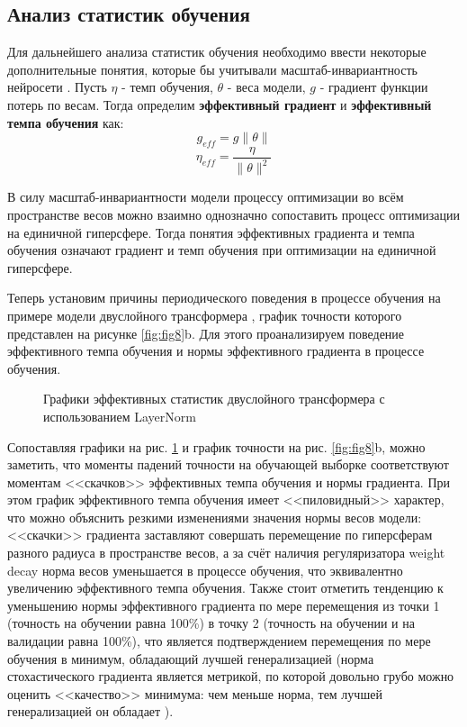 \documentclass{article}
\begin{document}
\subsection{Анализ статистик обучения}
Для дальнейшего анализа статистик обучения необходимо ввести некоторые дополнительные понятия, которые бы учитывали масштаб-инвариантность нейросети \cite{sam, asam}. Пусть $\eta$ - темп обучения, $\theta$ - веса модели, $g$ - градиент функции потерь по весам. Тогда определим \textbf{эффективный градиент} и \textbf{эффективный темпа обучения} как:
$$g_{eff} = g \|\theta\|$$
$$\eta_{eff} = \frac{\eta}{\|\theta\|^2}$$
\par В силу масштаб-инвариантности модели процессу оптимизации во всём пространстве весов можно взаимно однозначно сопоставить процесс оптимизации на единичной гиперсфере. Тогда понятия эффективных градиента и темпа обучения означают градиент и темп обучения при оптимизации на единичной гиперсфере.
\par Теперь установим причины периодического поведения в процессе обучения на примере модели двуслойного трансформера , график точности которого представлен на рисунке \ref{fig:fig8}b. Для этого проанализируем поведение эффективного темпа обучения и нормы эффективного градиента в процессе обучения.
\begin{figure}[h]
\centering
{}
\caption{Графики эффективных статистик двуслойного трансформера с использованием LayerNorm}
\label{fig:fig9}
\end{figure}
\par Сопоставляя графики на рис. \ref{fig:fig9} и график точности на рис. \ref{fig:fig8}b, можно заметить, что моменты падений точности на обучающей выборке соответствуют моментам <<скачков>> эффективных темпа обучения и нормы градиента. При этом график эффективного темпа обучения имеет <<пиловидный>> характер, что можно объяснить резкими изменениями значения нормы весов модели: <<скачки>> градиента заставляют совершать перемещение по гиперсферам разного радиуса в пространстве весов, а за счёт наличия регуляризатора weight decay норма весов уменьшается в процессе обучения, что эквивалентно увеличению эффективного темпа обучения. Также стоит отметить тенденцию к уменьшению нормы эффективного градиента по мере перемещения из точки 1 (точность на обучении равна 100\%) в точку 2 (точность на обучении и на валидации равна 100\%), что является подтверждением перемещения по мере обучения в минимум, обладающий лучшей генерализацией (норма стохастического градиента является метрикой, по которой довольно грубо можно оценить <<качество>> минимума: чем меньше норма, тем лучшей генерализацией он обладает \cite{sharpness, loss_surfaces}).
\end{document}
